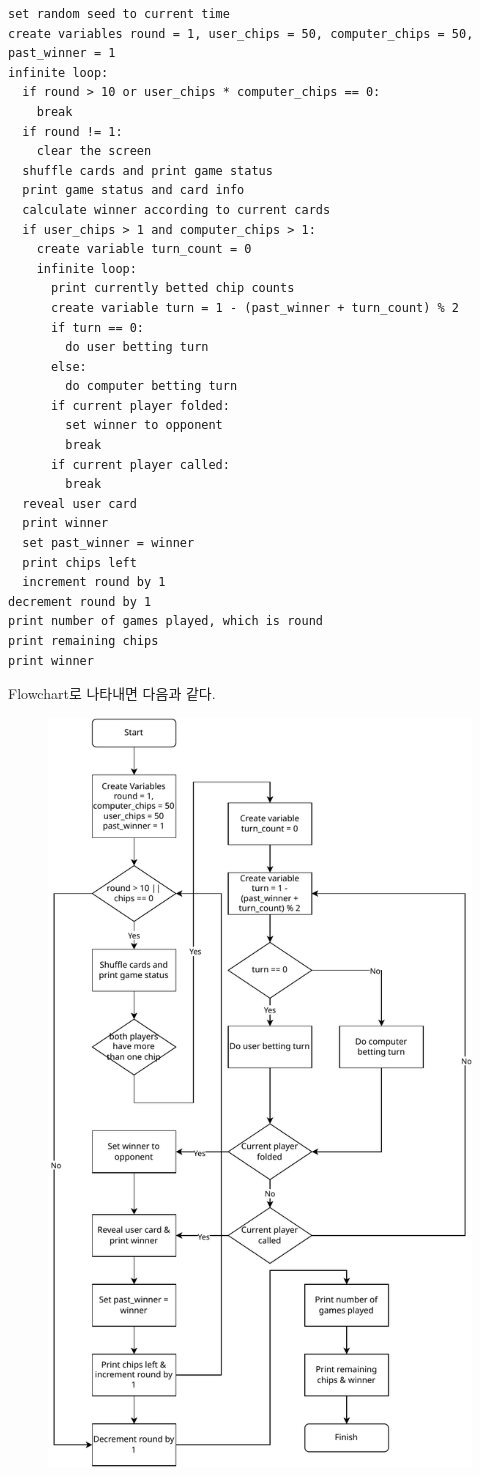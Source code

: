 \documentclass[titlepage]{article}
\begin{document}
\begin{lstlisting}
set random seed to current time
create variables round = 1, user_chips = 50, computer_chips = 50, past_winner = 1
infinite loop:
  if round > 10 or user_chips * computer_chips == 0:
    break
  if round != 1:
    clear the screen
  shuffle cards and print game status
  print game status and card info
  calculate winner according to current cards
  if user_chips > 1 and computer_chips > 1:
    create variable turn_count = 0
    infinite loop:
      print currently betted chip counts
      create variable turn = 1 - (past_winner + turn_count) % 2
      if turn == 0:
        do user betting turn
      else:
        do computer betting turn
      if current player folded:
        set winner to opponent
        break
      if current player called:
        break
  reveal user card
  print winner
  set past_winner = winner
  print chips left
  increment round by 1
decrement round by 1
print number of games played, which is round
print remaining chips
print winner
\end{lstlisting}

Flowchart로 나타내면 다음과 같다.

\begin{figure}[H]
  \centering
  \includegraphics[width=0.7\linewidth]{flowchart.drawio.pdf}
\end{figure}
\end{document}
